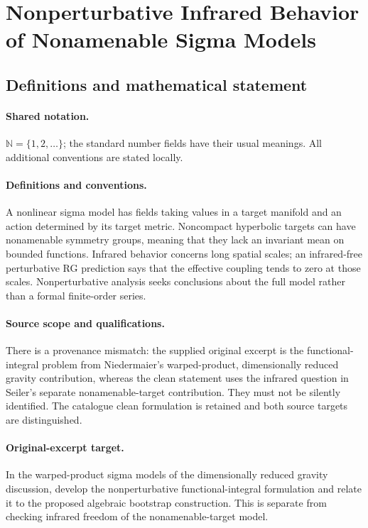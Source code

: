 \documentclass[11pt]{article}
\begin{document}
\section{Nonperturbative Infrared Behavior of Nonamenable Sigma Models}\label{statement}

\subsection{Definitions and mathematical statement}

\paragraph{Shared notation.}$\mathbb N=\{1,2,\ldots\}$; the standard number fields have their usual meanings. All additional conventions are stated locally.


\paragraph{Definitions and conventions.} A nonlinear sigma model has fields taking values in a target manifold and an action determined by its target metric. Noncompact hyperbolic targets can have nonamenable symmetry groups, meaning that they lack an invariant mean on bounded functions. Infrared behavior concerns long spatial scales; an infrared-free perturbative RG prediction says that the effective coupling tends to zero at those scales. Nonperturbative analysis seeks conclusions about the full model rather than a formal finite-order series.

\paragraph{Source scope and qualifications.} There is a provenance mismatch: the supplied original excerpt is the functional-integral problem from Niedermaier's warped-product, dimensionally reduced gravity contribution, whereas the clean statement uses the infrared question in Seiler's separate nonamenable-target contribution. They must not be silently identified. The catalogue clean formulation is retained and both source targets are distinguished.

\paragraph{Original-excerpt target.} In the warped-product sigma models of the dimensionally reduced gravity discussion, develop the nonperturbative functional-integral formulation and relate it to the proposed algebraic bootstrap construction. This is separate from checking infrared freedom of the nonamenable-target model.
\end{document}
